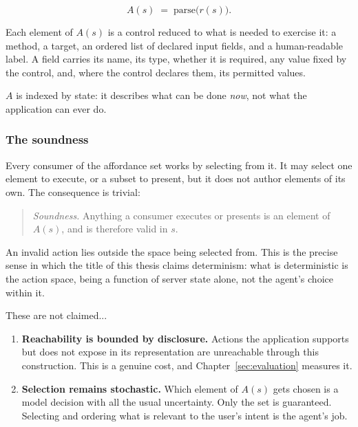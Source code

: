\[ 
A(s) \;=\; \mathrm{parse}\bigl(r(s)\bigr).
\] 

Each element of $A(s)$ is a control reduced to what is needed to exercise it: a method, a target, an ordered list of declared input fields, and a human-readable label. A field carries its name, its type, whether it is required, any value fixed by the control, and, where the control declares them, its permitted values.


$A$ is indexed by state: it describes what can be done \emph{now}, not what the application can ever do. 


\subsubsection{The soundness}\label{sec:design:soundness}

Every consumer of the affordance set works by selecting from it. It may select one element to execute, or a subset to present, but it does not author elements of its own. The consequence is trivial:

\begin{quote}
\emph{Soundness.} Anything a consumer executes or presents is an element of $A(s)$, and is therefore valid in $s$.
\end{quote}

An invalid action lies outside the space being selected from. This is the precise sense in which the title of this thesis claims determinism: what is deterministic is the action space, being a function of server state alone, not the agent's choice within it.


These are not claimed...

\begin{enumerate}
    \item \textbf{Reachability is bounded by disclosure.} Actions the application supports but does not expose in its representation are unreachable through this construction. This is a genuine cost, and Chapter~\ref{sec:evaluation} measures it.
    \item \textbf{Selection remains stochastic.} Which element of $A(s)$ gets chosen is a model decision with all the usual uncertainty. Only the set is guaranteed. Selecting and ordering what is relevant to the user's intent is the agent's job.
\end{enumerate}

